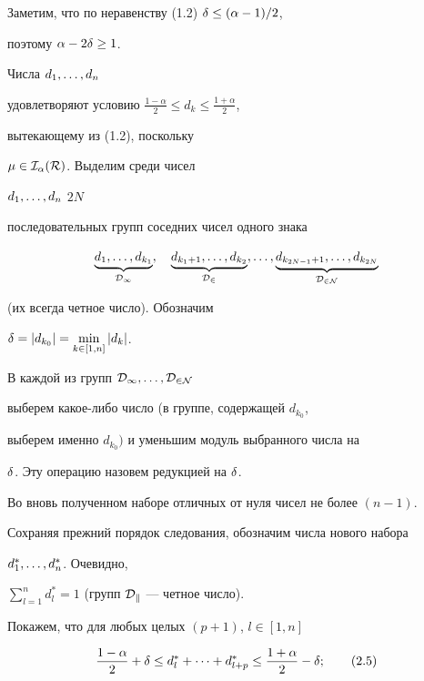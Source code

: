 Заметим, что по неравенству (1.2) $\delta \le (\alpha-1)/2$,


поэтому $\alpha-2\delta \ge 1$.





\begin{pf}


Числа $d_1, \dotsc, d_n$


удовлетворяют условию $\frac{1-\alpha}{2}\le d_k\le\frac{1+\alpha}{2}$,


вытекающему из (1.2), поскольку


$\mu \in \cal I_{\alpha}(R)$. Выделим среди чисел


$d_1, \dotsc, d_n$\; $2N$


последовательных групп соседних чисел одного знака


$$


\underbrace{d_1, \ld, d_{k_1}}_{\cal D_1}, \quad


\underbrace{d_{k_1+1}, \ld, d_{k_2}}_{\cal D_2}, \ld,


\underbrace{d_{k_{2N-1}+1}, \ld, d_{k_{2N}}}_{\cal D_{2N}}


$$


(их всегда четное число). Обозначим


$\delta=|d_{k_0}|=\min\limits_{k\in[1,n]} |d_k|$.


В каждой из групп $\cal D_1, \dotsc, \cal D_{2N}$


выберем какое-либо число (в группе, содержащей $d_{k_0}$,


выберем именно $d_{k_0})$ и уменьшим модуль выбранного числа на


$\delta$. Эту операцию назовем редукцией на $\delta$.


Во вновь полученном наборе отличных от нуля чисел не более $(n-1)$.


Сохраняя прежний порядок следования, обозначим числа нового набора


$d_1^*, \dotsc, d_n^*$. Очевидно,


$\sum\limits_{l=1}^n d_l^*=1$ (групп $\cal D_k$ --- четное число).


Покажем, что для любых целых $(p+1)$, $l \in [1,n]$


\begin{equation}


\frac{1-\al}{2}+\de \le d_l^*+ \cd + d_{l+p}^*\le


\frac{1+\al}{2}-\de; \tag{2.5}


\end{equation}



\end{pf}
